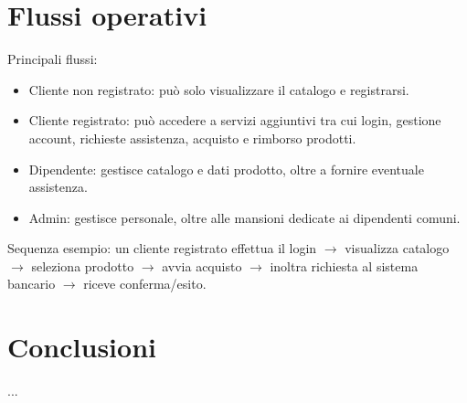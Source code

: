 \documentclass[a4paper,12pt]{article}
\begin{document}
\section{Flussi operativi}
Principali flussi:
\begin{itemize}
  \item Cliente non registrato: può solo visualizzare il catalogo e registrarsi.
  \item Cliente registrato: può accedere a servizi aggiuntivi tra cui login, gestione account, richieste assistenza, acquisto e rimborso prodotti.
  \item Dipendente: gestisce catalogo e dati prodotto, oltre a fornire eventuale assistenza.
  \item Admin: gestisce personale, oltre alle mansioni dedicate ai dipendenti comuni.
\end{itemize}
Sequenza esempio: un cliente registrato effettua il login $\rightarrow$ visualizza catalogo $\rightarrow$ seleziona prodotto $\rightarrow$ avvia acquisto $\rightarrow$ inoltra richiesta al sistema bancario $\rightarrow$ riceve conferma/esito.


\section{Conclusioni}
...
\end{document}
